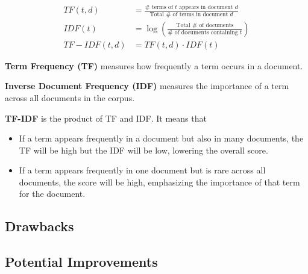 \begin{align}
    TF(t,d) &= \frac{\# \text{ terms of } t \text{ appears in document } d}{\text{Total } \# \text{ of terms in document }d}\\
    IDF(t) &= \log \left( \frac{\text{Total } \# \text{ of documents}}{\# \text{ of documents containing } t} \right)\\
    TF-IDF(t, d) &= TF(t,d) \cdot IDF(t)
\end{align}

\textbf{Term Frequency (TF)} measures how frequently a term occurs in a document.

\textbf{Inverse Document Frequency (IDF)} measures the importance of a term across all documents in the corpus.

\textbf{TF-IDF} is the product of TF and IDF. It means that 
\begin{itemize}
    \item If a term appears frequently in a document but also in many documents, the TF will be high but the IDF will be low, lowering the overall score.
    \item If a term appears frequently in one document but is rare across all documents, the score will be high, emphasizing the importance of that term for the document.
\end{itemize}


\subsection{Drawbacks}



\subsection{Potential Improvements}
